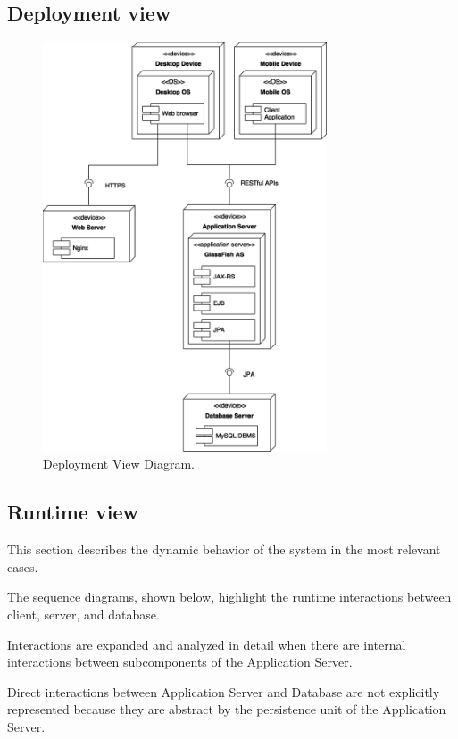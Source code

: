 \documentclass{article}
\begin{document}
	\subsection{Deployment view}
	\begin{figure}[!ht]
	\centering
	\includegraphics[width=0.75\textwidth]{img/diagrams/dv.png}
	\caption{Deployment View Diagram.}
	\end{figure}


	\newpage
	\subsection{Runtime view}
	This section describes the dynamic behavior of the system in the most relevant cases.

	The sequence diagrams, shown below, highlight the runtime interactions between client, server, and database.
	
	\bigskip
	Interactions are expanded and analyzed in detail when there are internal interactions between subcomponents of the Application Server.
	
	Direct interactions between Application Server and Database are not explicitly represented because they are abstract by the persistence unit of the Application Server.
\end{document}
